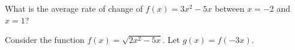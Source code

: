 \begin{questions}
\newpage

	
	
	
\question[8] What is the average rate of change of $f(x)=3x^2-5x$ between $x=-2$ and $x=1$?
\vfill

\question[5] 
Consider the function $f(x)=\sqrt{2x^2-5x}$. 
%    
%
%    
    Let $g(x)=f(-3x)$. 
    

\end{questions}
